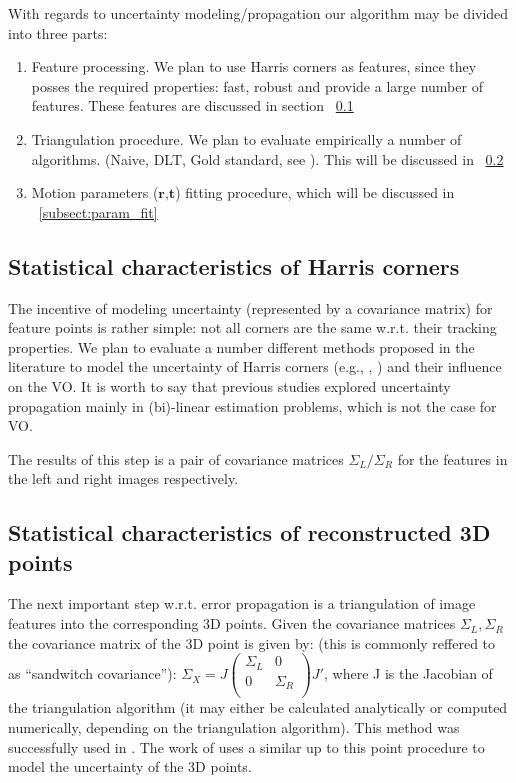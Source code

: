 \documentclass[10pt]{article}         %
\begin{document}
With regards to uncertainty modeling/propagation our algorithm may be divided into three parts:
\begin{enumerate}
\item Feature processing. We plan to use Harris corners as features, since they posses the required properties: fast, robust and provide a large number of features. These features are discussed in section ~\ref{subsect:harris_stats}
\item Triangulation procedure. We plan to evaluate empirically a number of algorithms. (Naive, DLT, Gold standard, see \cite{Hartley2004}). This will be discussed in ~\ref{subsect:3D_stats}
\item Motion parameters ($\textbf{r,t}$) fitting procedure, which will be discussed in ~\ref{subsect:param_fit}
\end{enumerate}

\subsection{Statistical characteristics of Harris corners}\label{subsect:harris_stats}
The incentive of modeling uncertainty (represented by a covariance matrix) for feature points is rather simple: not all corners are the same w.r.t. their tracking properties.  We plan to evaluate a number different methods proposed in the literature to model the uncertainty of Harris corners (e.g., \cite{orguner2007statistical}, \cite{brooks2001value}) and their influence on the VO.  It is worth to say that previous studies explored uncertainty propagation mainly in (bi)-linear estimation problems, which is not the case for VO.

The results of this step is a pair of covariance matrices $\Sigma_L/\Sigma_R$ for the features in the left and right images respectively.

\subsection{Statistical characteristics of reconstructed 3D points}\label{subsect:3D_stats}

The next important step w.r.t. error propagation is a triangulation of image features into the corresponding 3D points.  Given the covariance matrices $\Sigma_L,\Sigma_R$ the covariance matrix of the 3D point is given by: (this is commonly reffered to as ``sandwitch covariance''): $ \Sigma_{X} = J\begin{pmatrix}\Sigma_L&0\\  0& \Sigma_R\\  \end{pmatrix} J'$, where J is the Jacobian of the triangulation algorithm (it may either be calculated analytically or computed numerically, depending on the triangulation algorithm).  This method was successfully used in  \cite{matthies1989dynamic}.
The work of \cite{matthies1989dynamic} uses a similar up to this point procedure to model the uncertainty of the 3D points.
\end{document}
